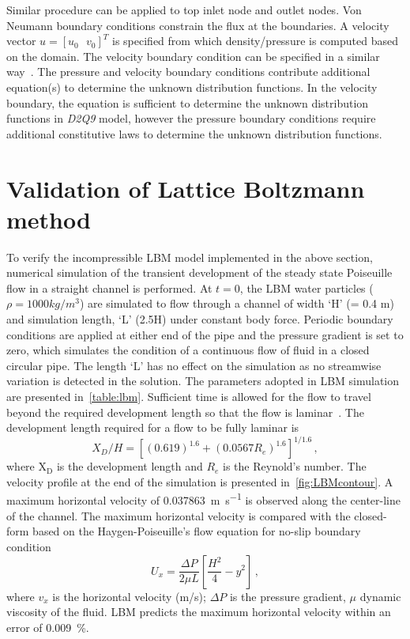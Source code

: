 Similar procedure can be applied to top inlet node and outlet 
nodes. Von Neumann boundary conditions constrain the flux at 
the boundaries. A velocity vector $u=\left[ u_0\mbox{ }v_0 
\right]^T$ is specified from which density/pressure is computed 
based on the domain. The velocity boundary condition can be 
specified in a similar way~\citep{Zou1997}. The pressure and 
velocity boundary conditions contribute additional equation(s) 
to determine the unknown distribution functions. In the 
velocity boundary, the equation is sufficient to determine the 
unknown distribution functions in \textit{D2Q9} model, however 
the pressure boundary conditions require additional 
constitutive laws to determine the unknown distribution 
functions. 

\section{Validation of Lattice Boltzmann method}

To verify the incompressible LBM model implemented in the above section, 
numerical simulation of the transient development of the steady state 
Poiseuille flow in a straight channel is performed. At $t=0$, the LBM water 
particles ($\rho=1000 kg/m^{3}$) are simulated to flow through a channel of 
width `H' (= 0.4 \si{\meter}) and simulation length, `L' (2.5H) under constant 
body force. Periodic boundary conditions are applied at either end of the pipe 
and the pressure gradient is set to zero, which simulates the condition of a 
continuous flow of fluid in a closed circular pipe. The length `L' has no 
effect on the simulation as no streamwise variation is detected in the 
solution. The parameters adopted in LBM simulation are presented 
in~\cref{table:lbm}. Sufficient time is allowed for the flow to travel beyond 
the required development length so that the flow is laminar~\citep{Durst2005}. 
The development length required for a flow to be fully laminar is
%
\begin{equation}
X_{D}/H=[(0.619)^{1.6}+(0.0567 R_{e})^{1.6}]^{1/1.6} \,,
\end{equation}
%
\noindent where $\mathrm{X}_{\mathrm{D}}$ is the development length and $R_{e}$ 
is the Reynold's number. The velocity profile at the end of the simulation is 
presented in~\cref{fig:LBMcontour}. A maximum horizontal velocity of 
0.037863~\si{\meter\per\second} is observed along the center-line of the 
channel. The maximum horizontal velocity is compared with the closed-form based 
on the Haygen-Poiseuille's flow equation for no-slip boundary 
condition~\citep{Willis2008}
%
\begin{equation}
	\mathit{U}_{\mathit{x}}=\frac{\Delta P}{2 \mu L} [\frac{H^{2}}{4}-y^{2}]\,,
\end{equation}
%
\noindent where $v_{x}$ is the horizontal velocity (m/s); $\Delta P$ is the 
pressure gradient, $\mu$ dynamic viscosity of the fluid. LBM predicts the 
maximum horizontal velocity within an error of 0.009~\%.

